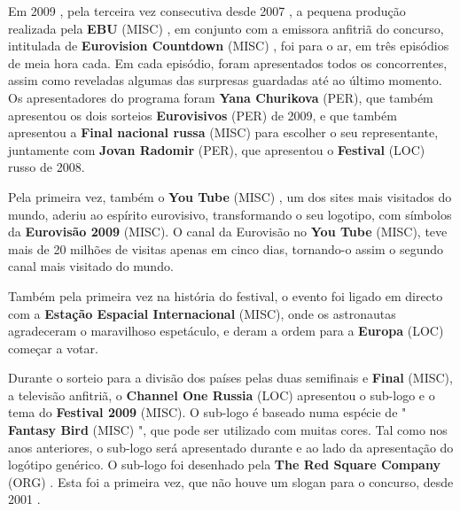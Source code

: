 \documentclass[12pt,a4paper]{article}
\begin{document}
Em 2009 , pela terceira vez consecutiva desde 2007 , a pequena produção realizada pela \textbf{EBU} (MISC) , em conjunto com a emissora anfitriã do concurso, intitulada de \textbf{Eurovision Countdown} (MISC) , foi para o ar, em três episódios de meia hora cada. Em cada episódio, foram apresentados todos os concorrentes, assim como reveladas algumas das surpresas guardadas até ao último momento. Os apresentadores do programa foram \textbf{Yana Churikova} (PER), que também apresentou os dois sorteios \textbf{Eurovisivos} (PER) de 2009, e que também apresentou a \textbf{Final nacional russa} (MISC) para escolher o seu representante, juntamente com \textbf{Jovan Radomir} (PER), que apresentou o \textbf{Festival} (LOC) russo de 2008.

Pela primeira vez, também o \textbf{You Tube} (MISC) , um dos sites mais visitados do mundo, aderiu ao espírito eurovisivo, transformando o seu logotipo, com símbolos da \textbf{Eurovisão 2009} (MISC). O canal da Eurovisão no \textbf{You Tube} (MISC), teve mais de 20 milhões de visitas apenas em cinco dias, tornando-o assim o segundo canal mais visitado do mundo.

Também pela primeira vez na história do festival, o evento foi ligado em directo com a \textbf{Estação Espacial Internacional} (MISC), onde os astronautas agradeceram o maravilhoso espetáculo, e deram a ordem para a \textbf{Europa} (LOC) começar a votar.

Durante o sorteio para a divisão dos países pelas duas semifinais e \textbf{Final} (MISC), a televisão anfitriã, o \textbf{Channel One Russia} (LOC) apresentou o sub-logo e o tema do \textbf{Festival 2009} (MISC). O sub-logo é baseado numa espécie de " \textbf{Fantasy Bird} (MISC) ", que pode ser utilizado com muitas cores. Tal como nos anos anteriores, o sub-logo será apresentado durante e ao lado da apresentação do logótipo genérico. O sub-logo foi desenhado pela \textbf{The Red Square Company} (ORG) . Esta foi a primeira vez, que não houve um slogan para o concurso, desde 2001 .
\end{document}
